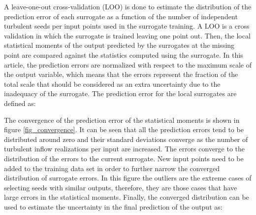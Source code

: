 \documentclass[preprint,12pt]{elsarticle}
\begin{document}
A leave-one-out cross-validation (LOO) is done to estimate the distribution of the prediction error of each surrogate as a function of the number of independent turbulent seeds per input points used in the surrogate training. A LOO is a cross validation in which the surrogate is trained leaving one point out. Then, the local statistical moments of the output predicted by the surrogates at the missing point are compared against the statistics computed using the surrogate. In this article, the prediction errors are normalized with respect to the maximum scale of the output variable, which means that the errors represent the fraction of the total scale that should be considered as an extra uncertainty due to the inadequacy of the surrogate. The prediction error for the local surrogates are defined as:




The convergence of the prediction error of the statistical moments is shown in figure \ref{fig_convergence}. It can be seen that all the prediction errors tend to be distributed around zero and their standard deviations converge as the number of turbulent inflow realizations per input are increased. The errors converge to the distribution of the errors to the current surrogate. New input points need to be added to the training data set in order to further narrow the converged distribution of surrogate errors. In this figure the outliers are the extreme cases of selecting seeds with similar outputs, therefore, they are those cases that have large errors in the statistical moments. Finally, the converged distribution can be used to estimate the uncertainty in the final prediction of the output as:

\end{document}
